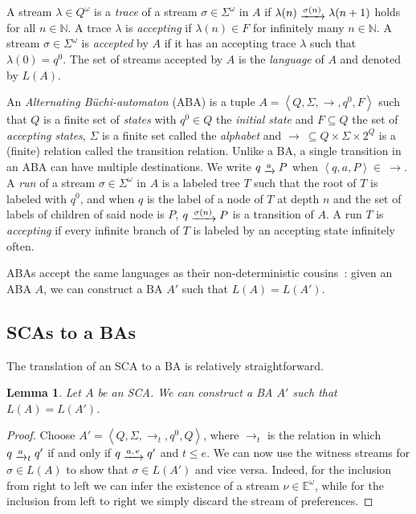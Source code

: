\documentclass[a4paper]{article}
\newcommand{\buchi}{B\"{u}chi}
\newcommand{\naturals}{\mathbb{N}}
\newcommand{\angl}[1]{\left\langle#1\right\rangle}
\newcommand{\myrightarrow}[1]{\mathrel{\raisebox{-3pt}{$\xrightarrow{#1}$}}}
\newcommand{\abscsemiring}{\mathbb{E}}
\newtheorem{lemma}{Lemma}
\theoremstyle{definition}
\begin{document}
\begin{appendix}
A stream $\lambda \in Q^\omega$ is a \emph{trace} of a stream $\sigma \in \Sigma^\omega$ in $A$ if $\lambda(n) \myrightarrow{\sigma(n)} \lambda(n+1)$ holds for all $n \in \naturals$. A trace $\lambda$ is \emph{accepting} if $\lambda(n) \in F$ for infinitely many $n \in \naturals$. A stream $\sigma \in \Sigma^\omega$ is \emph{accepted} by $A$ if it has an accepting trace $\lambda$ such that $\lambda(0) = q^0$. The set of streams accepted by $A$ is the \emph{language} of $A$ and denoted by $L(A)$.

An \emph{Alternating \buchi-automaton} (ABA) is a tuple $A = \angl{Q, \Sigma, \rightarrow, q^0, F}$ such that $Q$ is a finite set of \emph{states} with $q^0 \in Q$ the \emph{initial state} and $F \subseteq Q$ the set of \emph{accepting states}, $\Sigma$ is a finite set called the \emph{alphabet} and $\rightarrow \ \subseteq Q \times \Sigma \times 2^Q$ is a (finite) relation called the transition relation. Unlike a BA, a single transition in an ABA can have multiple destinations. We write $q \myrightarrow{a} P$ when $\angl{q, a, P} \in\ \rightarrow$. A \emph{run} of a stream $\sigma \in \Sigma^\omega$ in $A$ is a labeled tree $T$ such that the root of $T$ is labeled with $q^0$, and when $q$ is the label of a node of $T$ at depth $n$ and the set of labels of children of said node is $P$, $q \myrightarrow{\sigma(n)} P$ is a transition of $A$. A run $T$ is \emph{accepting} if every infinite branch of $T$ is labeled by an accepting state infinitely often.

ABAs accept the same languages as their non-deterministic cousins~\cite{miyano-hayashi-1984}: given an ABA $A$, we can construct a BA $A'$ such that $L(A) = L(A')$.

\subsection{SCAs to a BAs}

The translation of an SCA to a BA is relatively straightforward.

\begin{lemma}%
\label{lemma:sca-to-buchi}
Let $A$ be an SCA\@. We can construct a BA $A'$ such that $L(A) = L(A')$.
\end{lemma}
\begin{proof}
Choose $A' = \angl{Q, \Sigma, \rightarrow_t, q^0, Q}$, where $\rightarrow_t$ is the relation in which $q \myrightarrow{a}_t q'$ if and only if $q \myrightarrow{a,\, e} q'$ and $t \leq e$. We can now use the witness streams for $\sigma \in L(A)$ to show that $\sigma \in L(A')$ and vice versa. Indeed, for the inclusion from right to left we can infer the existence of a stream $\nu \in \abscsemiring^\omega$, while for the inclusion from left to right we simply discard the stream of preferences.
\end{proof}


\end{appendix}
\end{document}
